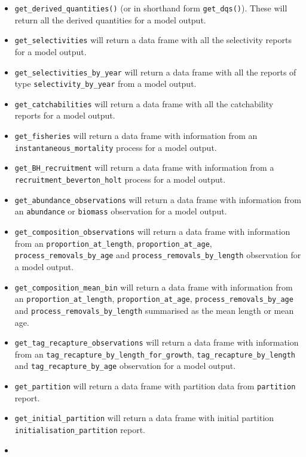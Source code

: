\documentclass[
]{book}
\begin{document}
\begin{itemize}
\item
  \texttt{get\_derived\_quantities()} (or in shorthand form \texttt{get\_dqs()}). These will return all the derived quantities for a model output.
\item
  \texttt{get\_selectivities} will return a data frame with all the selectivity reports for a model output.
\item
  \texttt{get\_selectivities\_by\_year} will return a data frame with all the reports of type \texttt{selectivity\_by\_year} from a model output.
\item
  \texttt{get\_catchabilities} will return a data frame with all the catchability reports for a model output.
\item
  \texttt{get\_fisheries} will return a data frame with information from an \texttt{instantaneous\_mortality} process for a model output.
\item
  \texttt{get\_BH\_recruitment} will return a data frame with information from a \texttt{recruitment\_beverton\_holt} process for a model output.
\item
  \texttt{get\_abundance\_observations} will return a data frame with information from an \texttt{abundance} or \texttt{biomass} observation for a model output.
\item
  \texttt{get\_composition\_observations} will return a data frame with information from an \texttt{proportion\_at\_length}, \texttt{proportion\_at\_age}, \texttt{process\_removals\_by\_age} and \texttt{process\_removals\_by\_length} observation for a model output.
\item
  \texttt{get\_composition\_mean\_bin} will return a data frame with information from an \texttt{proportion\_at\_length}, \texttt{proportion\_at\_age}, \texttt{process\_removals\_by\_age} and \texttt{process\_removals\_by\_length} summarised as the mean length or mean age.
\item
  \texttt{get\_tag\_recapture\_observations} will return a data frame with information from an \texttt{tag\_recapture\_by\_length\_for\_growth}, \texttt{tag\_recapture\_by\_length} and \texttt{tag\_recapture\_by\_age} observation for a model output.
\item
  \texttt{get\_partition} will return a data frame with partition data from \texttt{partition} report.
\item
  \texttt{get\_initial\_partition} will return a data frame with initial partition \texttt{initialisation\_partition} report.
\item

\end{itemize}
\end{document}
